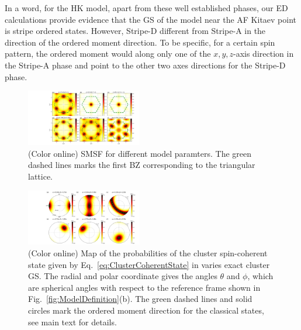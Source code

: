 \documentclass[aps,prb,reprint,amsfonts,amsmath,amssymb,showpacs,groupedaddress,superscriptaddress]{revtex4-1}
\begin{document}
In a word, for the HK model, apart from these well established phases, our ED calculations provide evidence that the GS of the model near the AF Kitaev point is stripe ordered states. However, Stripe-D different from Stripe-A in the direction of the ordered moment direction. To be specific, for a certain spin pattern, the ordered moment would along only one of the $x, y, z$-axis direction in the Stripe-A phase and point to the other two axes directions for the Stripe-D phase.

\begin{figure}
    \includegraphics[width=0.45\textwidth]{Fig3.pdf}
    \caption{\label{fig:StructureFactors}(Color online) SMSF for different model paramters. The green dashed lines marks the first BZ corresponding to the triangular lattice.}
\end{figure}
\begin{figure}
    \includegraphics[width=0.45\textwidth]{Fig4.pdf}
    \caption{\label{fig:Proabilities}(Color online) Map of the probabilities of the cluster spin-coherent state given by Eq.~\eqref{eq:ClusterCoherentState} in varies exact cluster GS. The radial and polar coordinate gives the angles $\theta$ and $\phi$, which are spherical angles with respect to the reference frame shown in Fig.~\ref{fig:ModelDefinition}(b). The green dashed lines and solid circles mark the ordered moment direction for the classical states, see main text for details.}
\end{figure}
\end{document}
